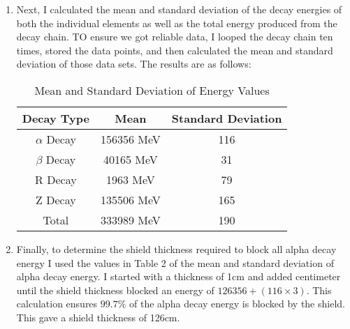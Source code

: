 \documentclass[12pt]{article}
\begin{document}
\begin{enumerate}
\item Next, I calculated the mean and standard deviation of the decay energies of both the individual elements as well as the total energy produced from the decay chain. TO ensure we got reliable data, I looped the decay chain ten times, stored the data points, and then calculated the mean and standard deviation of those data sets. The results are as follows:

\begin{table} [h]
    \centering
    \begin{tabular}{|c|c|c|}
        \hline
        Decay Type & Mean & Standard Deviation \\ \hline
        $\alpha$ Decay & 156356 MeV & 116 \\ \hline
        $\beta$ Decay & 40165 MeV & 31 \\ \hline
        R Decay & 1963 MeV & 79 \\ \hline
        Z Decay & 135506 MeV & 165 \\ \hline
        Total & 333989 MeV & 190 \\ \hline
    \end{tabular}
    \caption{Mean and Standard Deviation of Energy Values}
    \label{tab:my_label}
\end{table}

\item Finally, to determine the shield thickness required to block all alpha decay energy I used the values in Table 2 of the mean and standard deviation of alpha decay energy. I started with a thickness of 1cm and added centimeter until the shield thickness blocked an energy of $126356+(116\times3)$. This calculation ensures $ 99.7 \% $ of the alpha decay energy is blocked by the shield. This gave a shield thickness of 126cm. 

\end{enumerate}


 
 
\end{document}
